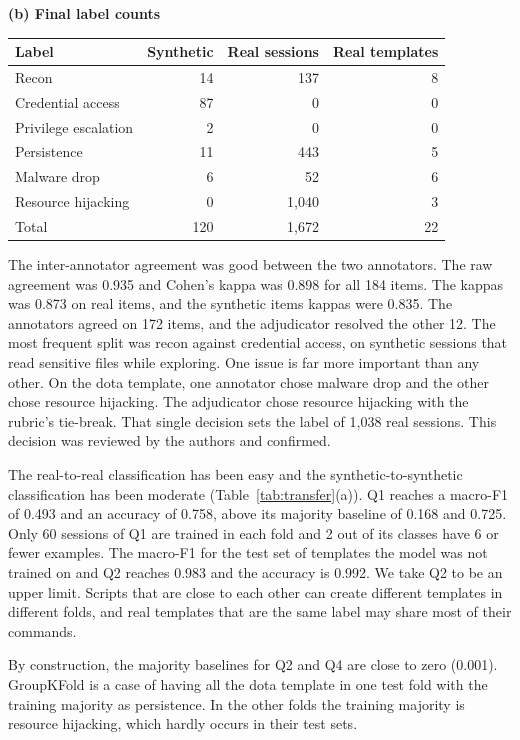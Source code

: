 \documentclass[runningheads]{llncs}
\begin{document}
\begin{table}[t]
\vspace{8pt}
\textbf{(b) Final label counts}\\[3pt]
\begin{tabular}{@{}lrrr@{}}
\toprule
Label & Synthetic & Real sessions & Real templates \\
\midrule
Recon                & 14  & 137   & 8  \\
Credential access    & 87  & 0     & 0  \\
Privilege escalation & 2   & 0     & 0  \\
Persistence          & 11  & 443   & 5  \\
Malware drop         & 6   & 52    & 6  \\
Resource hijacking   & 0   & 1,040 & 3  \\
\midrule
Total                & 120 & 1,672 & 22 \\
\bottomrule
\end{tabular}
\end{table}

The inter-annotator agreement was good between the two annotators. The raw agreement was 0.935 and Cohen's kappa was 0.898 for all 184 items. The kappas was 0.873 on real items, and the synthetic items kappas were 0.835. The annotators agreed on 172 items, and the adjudicator resolved the other 12. The most frequent split was recon against credential access, on synthetic sessions that read sensitive files while exploring. One issue is far more important than any other. On the dota template, one annotator chose malware drop and the other chose resource hijacking. The adjudicator chose resource hijacking with the rubric's tie-break. That single decision sets the label of 1,038 real sessions. This decision was reviewed by the authors and confirmed.

The real-to-real classification has been easy and the synthetic-to-synthetic classification has been moderate (Table~\ref{tab:transfer}(a)). Q1 reaches a macro-F1 of 0.493 and an accuracy of 0.758, above its majority baseline of 0.168 and 0.725. Only 60 sessions of Q1 are trained in each fold and 2 out of its classes have 6 or fewer examples. The macro-F1 for the test set of templates the model was not trained on and Q2 reaches 0.983 and the accuracy is 0.992. We take Q2 to be an upper limit. Scripts that are close to each other can create different templates in different folds, and real templates that are the same label may share most of their commands.

By construction, the majority baselines for Q2 and Q4 are close to zero (0.001). GroupKFold is a case of having all the dota template in one test fold with the training majority as persistence. In the other folds the training majority is resource hijacking, which hardly occurs in their test sets.
\end{document}
